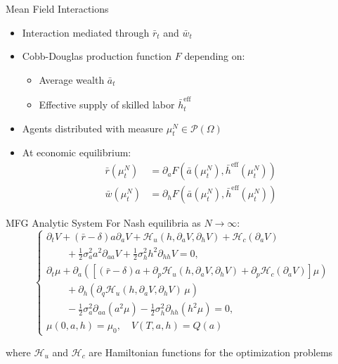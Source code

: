 \documentclass{beamer}
\newcommand{\HH}{\mathcal{H}}
\newcommand{\heff}{\bar h^{\text{eff}}}
\begin{document}
\begin{frame}{Mean Field Interactions}
\begin{itemize}
    \item Interaction mediated through $\bar r_t$ and $\bar w_t$
    \item Cobb-Douglas production function $F$ depending on:
    \begin{itemize}
        \item Average wealth $\bar a_t$
        \item Effective supply of skilled labor $\heff_t$
    \end{itemize}
    \item Agents distributed with measure $\mu^N_t \in \mathcal{P}(\Omega)$
    \item At economic equilibrium:
    \begin{align}
        \bar r(\mu^N_t) &= \partial_a F(\bar a(\mu^N_t), \heff(\mu^N_t))\\
        \bar w(\mu^N_t) &= \partial_h F(\bar a(\mu^N_t), \heff(\mu^N_t))
    \end{align}
\end{itemize}
\end{frame}

\begin{frame}{MFG Analytic System}
For Nash equilibria as $N \to \infty$:
\begin{equation}
    \begin{cases}
        \partial_t V + (\bar r  - \delta) a \partial_a V + \HH_u(h, \partial_a V, \partial_h V)  + \HH_c(\partial_a V) \\
        \quad\quad + \frac{1}{2} \sigma_a^2 a^2 \partial_{aa} V + \frac{1}{2} \sigma^2_h h^2 \partial_{hh} V = 0,\\
        \partial_t \mu + \partial_a \left( \left[ (\bar r - \delta) a + \partial_p \HH_u(h, \partial_a V, \partial_h V) + \partial_p \HH_c(\partial_a V) \right] \mu \right) \\
        \quad\quad + \partial_h \left( \partial_q \HH_u(h, \partial_a V, \partial_h V)\, \mu\right) \\
        \quad\quad - \frac{1}{2} \sigma_a^2 \partial_{aa} (a^2\mu) - \frac{1}{2} \sigma^2_h \partial_{hh} (h^2\mu) = 0,\\
        \mu(0,a,h) = \mu_0,\quad V(T,a,h) = Q(a)
    \end{cases}
\end{equation}

where $\HH_u$ and $\HH_c$ are Hamiltonian functions for the optimization problems
\end{frame}
\end{document}

